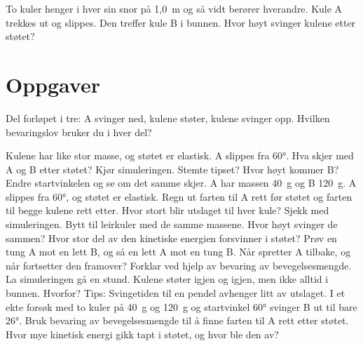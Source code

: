 \documentclass[11pt]{article}
\begin{document}

To kuler henger i hver sin snor på 1,0~m og så vidt berører hverandre. Kule A trekkes ut og slippes. Den treffer kule B i bunnen. Hvor høyt svinger kulene etter støtet?

\section*{Oppgaver}

Del forløpet i tre: A svinger ned, kulene støter, kulene svinger opp. Hvilken bevaringslov bruker du i hver del?

\begin{oppgaveliste}
\oppgave {}Kulene har like stor masse, og støtet er elastisk. A slippes fra 60°. Hva skjer med A og B etter støtet?
\svar
\oppgave {}Kjør simuleringen. Stemte tipset? Hvor høyt kommer B? Endre startvinkelen og se om det samme skjer.
\svar
\oppgave {}A har massen 40~g og B 120~g. A slippes fra 60°, og støtet er elastisk. Regn ut farten til A rett før støtet og farten til begge kulene rett etter. Hvor stort blir utslaget til hver kule? Sjekk med simuleringen.
\svar
\oppgave {}Bytt til leirkuler med de samme massene. Hvor høyt svinger de sammen? Hvor stor del av den kinetiske energien forsvinner i støtet?
\svar
\oppgave {}Prøv en tung A mot en lett B, og så en lett A mot en tung B. Når spretter A tilbake, og når fortsetter den framover? Forklar ved hjelp av bevaring av bevegelsesmengde.
\svar
\oppgave {}La simuleringen gå en stund. Kulene støter igjen og igjen, men ikke alltid i bunnen. Hvorfor? Tips: Svingetiden til en pendel avhenger litt av utslaget.
\svar
\oppgave {}I et ekte forsøk med to kuler på 40~g og 120~g og startvinkel 60° svinger B ut til bare 26°. Bruk bevaring av bevegelsesmengde til å finne farten til A rett etter støtet. Hvor mye kinetisk energi gikk tapt i støtet, og hvor ble den av?
\svar
\end{oppgaveliste}
\end{document}
